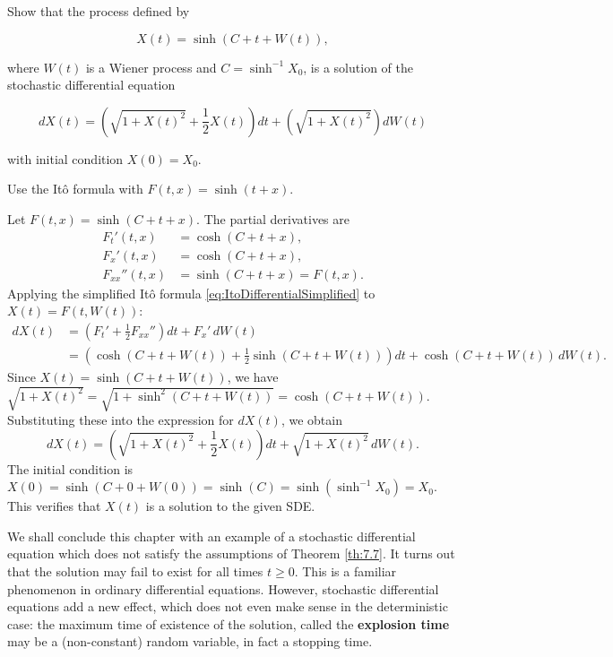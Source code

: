 \begin{Exercise}
\label{ex:7.22}
Show that the process defined by

\begin{equation}
X(t) = \sinh(C + t + W(t)),
\end{equation}

where $W(t)$ is a Wiener process and $C = \sinh^{-1} X_0$, is a solution of the stochastic differential equation

\begin{equation}
dX(t) = \left(\sqrt{1 + X(t)^2} + \frac{1}{2} X(t)\right) dt + \left(\sqrt{1 + X(t)^2}\right) dW(t)
\end{equation}

with initial condition $X(0) = X_0$.

\begin{hint}
Use the Itô formula with $F(t, x) = \sinh(t + x)$.
\end{hint}
\end{Exercise}

\begin{Solution}
Let $F(t, x) = \sinh(C + t + x)$. The partial derivatives are
\begin{align*}
F_t'(t, x) &= \cosh(C + t + x), \\
F_x'(t, x) &= \cosh(C + t + x), \\
F_{xx}''(t, x) &= \sinh(C + t + x) = F(t, x).
\end{align*}
Applying the simplified Itô formula \eqref{eq:ItoDifferentialSimplified} to $X(t) = F(t, W(t))$:
\begin{align*}
dX(t) &= \left( F_t' + \frac{1}{2} F_{xx}'' \right) dt + F_x' \, dW(t) \\
&= \left( \cosh(C + t + W(t)) + \frac{1}{2} \sinh(C + t + W(t)) \right) dt + \cosh(C + t + W(t)) \, dW(t).
\end{align*}
Since $X(t) = \sinh(C + t + W(t))$, we have $\sqrt{1 + X(t)^2} = \sqrt{1 + \sinh^2(C + t + W(t))} = \cosh(C + t + W(t))$.
Substituting these into the expression for $dX(t)$, we obtain
\begin{equation*}
dX(t) = \left( \sqrt{1 + X(t)^2} + \frac{1}{2} X(t) \right) dt + \sqrt{1 + X(t)^2} \, dW(t).
\end{equation*}
The initial condition is $X(0) = \sinh(C + 0 + W(0)) = \sinh(C) = \sinh(\sinh^{-1} X_0) = X_0$. This verifies that $X(t)$ is a solution to the given SDE.
\end{Solution}

We shall conclude this chapter with an example of a stochastic differential equation which does not satisfy the assumptions of Theorem \ref{th:7.7}. It turns out that the solution may fail to exist for all times $t \geq 0$. This is a familiar phenomenon in ordinary differential equations. However, stochastic differential equations add a new effect, which does not even make sense in the deterministic case: the maximum time of existence of the solution, called the \textbf{explosion time} may be a (non-constant) random variable, in fact a stopping time.

